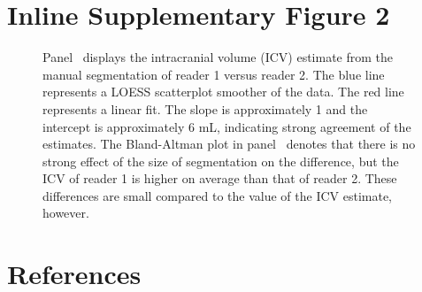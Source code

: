 \documentclass{elsarticle}\usepackage[]{graphicx}\usepackage[]{color}
\begin{document}
\section*{Inline Supplementary Figure 2}
\begin{figure}[H]
\hfill
\caption{ Panel~\protect{} displays the intracranial volume (ICV) estimate from the manual segmentation of reader 1 versus reader 2.  The blue line represents a LOESS scatterplot smoother of the data.  The red line represents a linear fit.  The slope is approximately 1 and the intercept is approximately 6 mL, indicating strong agreement of the estimates.  The Bland-Altman plot in panel~\protect{} denotes that there is no strong effect of the size of segmentation on the difference, but the ICV of reader 1 is higher on average than that of reader 2.  These differences are small compared to the value of the ICV estimate, however.}
\label{fig:reader_compare}
\end{figure}





\newpage
\section*{References}


\end{document}
